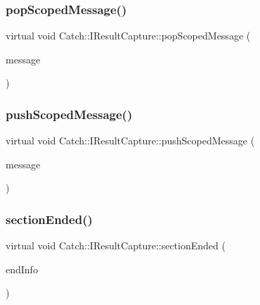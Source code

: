 \hypertarget{struct_catch_1_1_i_result_capture_a42bcb13276706bf8c3ce081ce16d37fd}{}\label{struct_catch_1_1_i_result_capture_a42bcb13276706bf8c3ce081ce16d37fd} 
\subsubsection{\texorpdfstring{pop\+Scoped\+Message()}{popScopedMessage()}}
{\footnotesize\ttfamily virtual void Catch\+::\+I\+Result\+Capture\+::pop\+Scoped\+Message (\begin{DoxyParamCaption}\item[{\hyperlink{struct_catch_1_1_message_info}{Message\+Info} const \&}]{message }\end{DoxyParamCaption})\hspace{0.3cm}{\ttfamily [pure virtual]}}

\hypertarget{struct_catch_1_1_i_result_capture_a91d154c1e087e383dcde5aad95cb6a05}{}\label{struct_catch_1_1_i_result_capture_a91d154c1e087e383dcde5aad95cb6a05} 
\subsubsection{\texorpdfstring{push\+Scoped\+Message()}{pushScopedMessage()}}
{\footnotesize\ttfamily virtual void Catch\+::\+I\+Result\+Capture\+::push\+Scoped\+Message (\begin{DoxyParamCaption}\item[{\hyperlink{struct_catch_1_1_message_info}{Message\+Info} const \&}]{message }\end{DoxyParamCaption})\hspace{0.3cm}{\ttfamily [pure virtual]}}

\hypertarget{struct_catch_1_1_i_result_capture_a4e152bc43dc0933684e31fa67a58195d}{}\label{struct_catch_1_1_i_result_capture_a4e152bc43dc0933684e31fa67a58195d} 
\subsubsection{\texorpdfstring{section\+Ended()}{sectionEnded()}}
{\footnotesize\ttfamily virtual void Catch\+::\+I\+Result\+Capture\+::section\+Ended (\begin{DoxyParamCaption}\item[{\hyperlink{struct_catch_1_1_section_end_info}{Section\+End\+Info} const \&}]{end\+Info }\end{DoxyParamCaption})\hspace{0.3cm}{\ttfamily [pure virtual]}}

